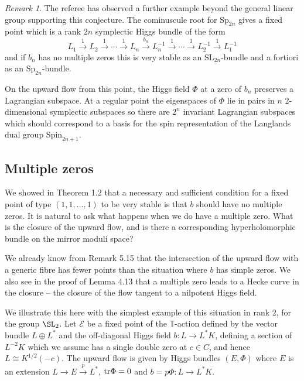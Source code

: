 \documentclass[12pt]{article}
\numberwithin{equation}{section}
\theoremstyle{remark}
\newtheorem{remark}[theorem]{Remark}
\theoremstyle{definition}
\numberwithin{theorem}{section}
\newcommand{\T}{{\mathbb{T}}}
\newcommand{\tr}{\textnormal{tr}}
\renewcommand{\1}{\mathbbm{1}}
\begin{document}
	\begin{remark}
The referee has observed a further example beyond the general linear group supporting this conjecture. The cominuscule root for $\mathrm{Sp}_{2n}$ gives a fixed point which is a rank $2n$ symplectic Higgs bundle of the form 
$$L_1\stackrel{1}\rightarrow L_2\stackrel{1}\rightarrow\cdots \stackrel{1}\rightarrow L_n\stackrel{b_n}\rightarrow L_n^{-1}\stackrel{1}\rightarrow \cdots \stackrel{1}\rightarrow L_2^{-1}\stackrel{1}\rightarrow L_1^{-1}$$
	and if $b_n$ has no multiple zeros this is very stable as an $\mathrm {SL}_{2n}$-bundle and a fortiori as an $\mathrm{Sp}_{2n}$-bundle. 
	
	On the upward flow from this point, the Higgs field $\Phi$
	at a zero of $b_n$  preserves a Lagrangian subspace. At a regular point the eigenspaces of $\Phi$ lie in pairs  in $n$ $2$-dimensional symplectic subspaces so there are $2^n$ invariant Lagrangian subspaces which should correspond  to a basis for the spin representation of the Langlands dual group $\mathrm{Spin}_{2n+1}.$ 

\end{remark}


\subsection{Multiple zeros} \label{multiple}

We showed in Theorem 1.2 that a necessary and sufficient condition for a fixed point of type $(1,1,\dots,1)$ to be very stable is that $b$
should have no multiple zeros. It is natural to ask what happens when we do have a multiple zero. What is the closure of the upward flow, 
and is there a corresponding hyperholomorphic bundle on the mirror moduli space? 

We already know from Remark 5.15 that the intersection 
of the upward flow with a generic fibre has fewer points than the situation where $b$ has simple zeros. We also see in the proof of Lemma 4.13 
that a multiple zero leads to a Hecke curve in the closure -- the closure of the flow tangent to a nilpotent Higgs field. 

We illustrate this  here with the simplest 
example of this situation in rank $2$, for the group $\SL_2$. Let ${\mathcal E}$ be a fixed point of the $\T$-action defined by the vector bundle
$L\oplus L^*$ and the off-diagonal Higgs 
field $b: L\rightarrow L^*K$, defining  a section of $L^{-2}K$ which we assume has  a single double zero at $c\in C$, and hence $L\cong K^{1/2}(-c)$.
The upward
flow is given
by Higgs bundles $(E,\Phi)$ where $E$ is an extension $L\rightarrow E\stackrel p\rightarrow L^*$, $\tr \Phi=0$ and $b=p \Phi:L\rightarrow L^*K$.  
\end{document}
